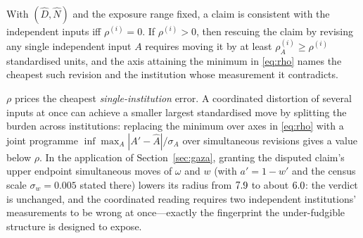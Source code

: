 \begin{theorem}\label{thm:contradiction}
With $(\hat D,\hat N)$ and the exposure range fixed, a claim is consistent with the independent inputs iff $\rho^{(i)}=0$. If $\rho^{(i)}>0$, then rescuing the claim by revising any single independent input $A$ requires moving it by at least $\rho_A^{(i)}\ge\rho^{(i)}$ standardised units, and the axis attaining the minimum in \eqref{eq:rho} names the cheapest such revision and the institution whose measurement it contradicts.
\end{theorem}

\begin{remark}\label{rem:joint}
$\rho$ prices the cheapest \emph{single-institution} error. A coordinated distortion of several inputs at once can achieve a smaller largest standardised move by splitting the burden across institutions: replacing the minimum over axes in \eqref{eq:rho} with a joint programme $\inf\max_A |A'-\hat A|/\sigma_A$ over simultaneous revisions gives a value below $\rho$. In the application of Section~\ref{sec:gaza}, granting the disputed claim's upper endpoint simultaneous moves of $\omega$ and $w$ (with $a'=1-w'$ and the census scale $\sigma_w=0.005$ stated there) lowers its radius from $7.9{}$ to about $6.0{}$: the verdict is unchanged, and the coordinated reading requires two independent institutions' measurements to be wrong at once---exactly the fingerprint the under-fudgible structure is designed to expose.
\end{remark}

